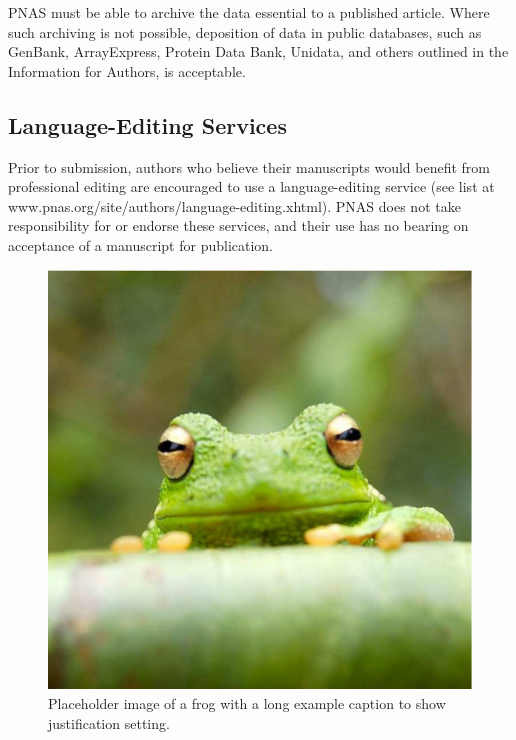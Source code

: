 \documentclass[9pt,twocolumn,twoside,lineno]{pnas-new}
\begin{document}
PNAS must be able to archive the data essential to a published article. Where such archiving is not possible, deposition of data in public databases, such as GenBank, ArrayExpress, Protein Data Bank, Unidata, and others outlined in the Information for Authors, is acceptable.

\subsection*{Language-Editing Services}
Prior to submission, authors who believe their manuscripts would benefit from professional editing are encouraged to use a language-editing service (see list at www.pnas.org/site/authors/language-editing.xhtml). PNAS does not take responsibility for or endorse these services, and their use has no bearing on acceptance of a manuscript for publication. 

\begin{figure}%
\centering
\includegraphics[width=.8\linewidth]{frog}
\caption{Placeholder image of a frog with a long example caption to show justification setting.}
\label{fig:frog}
\end{figure}
\end{document}
